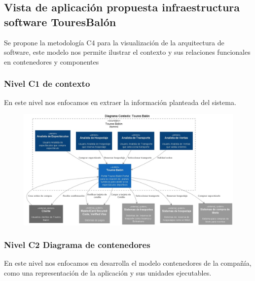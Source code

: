 \documentclass[12pt]{article}
\begin{document}
\subsection{Vista de aplicación propuesta infraestructura software TouresBalón}

Se propone la metodología C4 para la visualización de la arquitectura de software, este modelo nos permite ilustrar el contexto y sus relaciones funcionales en contenedores y componentes 

\subsubsection{Nivel C1 de contexto}

En este nivel nos enfocamos en extraer la información planteada del sistema.

\begin{figure}[ht]
\centering
\centering
\includegraphics[scale=0.4]{DC.jpeg}
\label{2}
\end{figure}
\FloatBarrier

\subsubsection{Nivel C2 Diagrama de contenedores}

En este nivel nos enfocamos en desarrolla el modelo contenedores de la compañía, como una representación de la aplicación y sus unidades ejecutables.
\end{document}
